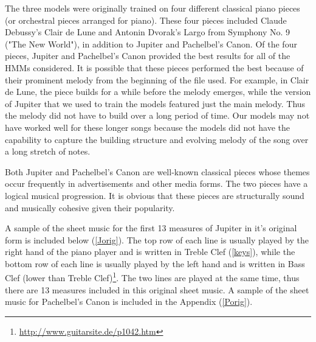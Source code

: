 \documentclass{article} %
\begin{document}
The three models were originally trained on four different classical piano pieces (or orchestral pieces arranged for piano).  These four pieces included Claude Debussy's Clair de Lune and Antonin Dvorak's Largo from Symphony No. 9 ("The New World"), in addition to Jupiter and Pachelbel's Canon.  Of the four pieces, Jupiter and Pachelbel's Canon provided the best results for all of the HMMs considered. It is possible that these pieces performed the best because of their prominent melody from the beginning of the file used. For example, in  Clair de Lune, the piece builds for a while before the melody emerges, while the version of Jupiter that we used to train the models featured just the main melody. Thus the melody did not have to build over a long period of time. Our models may not have worked well for these longer songs because the models did not have the capability to capture the building structure and evolving melody of the song over a long stretch of notes.  

Both Jupiter and Pachelbel's Canon are well-known classical pieces whose themes occur frequently in advertisements and other media forms. The two pieces have a logical musical progression. It is obvious that these pieces are structurally sound and musically cohesive given their popularity. 

 A sample of the sheet music for the first 13 measures of Jupiter in it's original form is included below (\autoref{Jorig}).  The top row of each line is usually played by the right hand of the piano player and is written in Treble Clef (\autoref{keys}), while the bottom row of each line is usually played by the left hand and is written in Bass Clef  (lower than Treble Clef)\footnote{\url{http://www.guitarsite.de/p1042.htm}}. The two lines are played at the same time, thus there are 13 measures included in this original sheet music.  A sample of the sheet music for Pachelbel's Canon is included in the Appendix (\autoref{Porig}).
 

 
 
\end{document}
